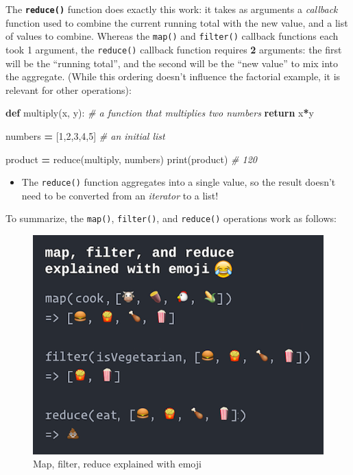 \documentclass[]{book}
\newenvironment{Shaded}{\begin{snugshade}}{\end{snugshade}}
\newcommand{\KeywordTok}[1]{\textcolor[rgb]{0.13,0.29,0.53}{\textbf{#1}}}
\newcommand{\DecValTok}[1]{\textcolor[rgb]{0.00,0.00,0.81}{#1}}
\newcommand{\CommentTok}[1]{\textcolor[rgb]{0.56,0.35,0.01}{\textit{#1}}}
\newcommand{\ControlFlowTok}[1]{\textcolor[rgb]{0.13,0.29,0.53}{\textbf{#1}}}
\newcommand{\OperatorTok}[1]{\textcolor[rgb]{0.81,0.36,0.00}{\textbf{#1}}}
\newcommand{\BuiltInTok}[1]{#1}
\newcommand{\NormalTok}[1]{#1}
\providecommand{\tightlist}{%
  \setlength{\itemsep}{0pt}\setlength{\parskip}{0pt}}
\begin{document}
The \textbf{\texttt{reduce()}} function does exactly this work: it takes
as arguments a \emph{callback} function used to combine the current
running total with the new value, and a list of values to combine.
Whereas the \texttt{map()} and \texttt{filter()} callback functions each
took 1 argument, the \texttt{reduce()} callback function requires
\textbf{2} arguments: the first will be the ``running total'', and the
second will be the ``new value'' to mix into the aggregate. (While this
ordering doesn't influence the factorial example, it is relevant for
other operations):

\begin{Shaded}
\begin{Highlighting}[]
\KeywordTok{def}\NormalTok{ multiply(x, y): }\CommentTok{# a function that multiplies two numbers}
    \ControlFlowTok{return}\NormalTok{ x}\OperatorTok{*}\NormalTok{y}

\NormalTok{numbers }\OperatorTok{=}\NormalTok{ [}\DecValTok{1}\NormalTok{,}\DecValTok{2}\NormalTok{,}\DecValTok{3}\NormalTok{,}\DecValTok{4}\NormalTok{,}\DecValTok{5}\NormalTok{]  }\CommentTok{# an initial list}

\NormalTok{product }\OperatorTok{=} \BuiltInTok{reduce}\NormalTok{(multiply, numbers)}
\BuiltInTok{print}\NormalTok{(product)  }\CommentTok{# 120}
\end{Highlighting}
\end{Shaded}

\begin{itemize}
\tightlist
\item
  The \texttt{reduce()} function aggregates into a single value, so the
  result doesn't need to be converted from an \emph{iterator} to a list!
\end{itemize}

To summarize, the \texttt{map()}, \texttt{filter()}, and
\texttt{reduce()} operations work as follows:

\begin{figure}
\centering
\includegraphics{imgs/07-img/map-filter-reduce-in-emoji-python.png}
\caption{Map, filter, reduce explained with emoji}
\end{figure}
\end{document}
